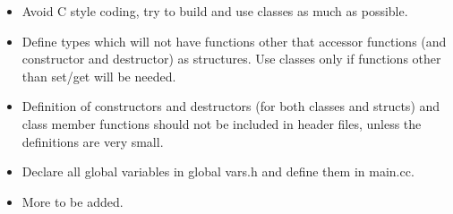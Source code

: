\begin{itemize}

  \item Avoid C style coding, try to build and use classes as much as
    possible.

  \item Define types which will not have functions other that accessor
    functions (and constructor and destructor) as structures. Use
    classes only if functions other than set/get will be needed.

  \item Definition of constructors and destructors (for both classes
    and structs) and class member functions should not be included in
    header files, unless the definitions are very small.

  \item Declare all global variables in global vars.h and define them
    in main.cc.

  \item More to be added.
\end{itemize}




